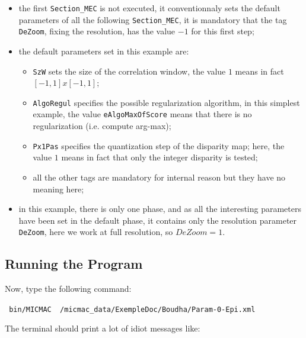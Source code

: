 \begin{itemize}
    \item the first {\tt Section\_MEC}  is not executed, it conventionnaly sets the default
          parameters of all the following  {\tt Section\_MEC}, it is mandatory that the 
          tag {\tt DeZoom}, fixing the resolution, has the value $-1$ for this first step;


    \item the default parameters set in this example are:

\begin{itemize}
         \item {\tt SzW} sets the size of the correlation window, the value $1$
               means in fact $[-1,1]x[-1,1]$;

          \item {\tt AlgoRegul} specifies the possible regularization algorithm,  in this
                simplest example, the value {\tt eAlgoMaxOfScore} means that there is
                no regularization (i.e. compute arg-max);

          \item {\tt Px1Pas} specifies the quantization step of  the disparity map;
                here, the value $1$ means in fact that  only the integer disparity is tested;

          \item all the other tags are mandatory for internal reason but they have no
                meaning here;
\end{itemize}

    \item in this example, there is only one phase, and as all the interesting parameters
          have been set in the default phase, it contains only the resolution parameter
          {\tt DeZoom}, here we work at full resolution, so $DeZoom=1$.

\end{itemize}



\subsection{Running the Program}

Now, type the following command:

{\tt
bin/MICMAC ~/micmac\_data/ExempleDoc/Boudha/Param-0-Epi.xml 
}

The terminal should print a lot of idiot messages like:

